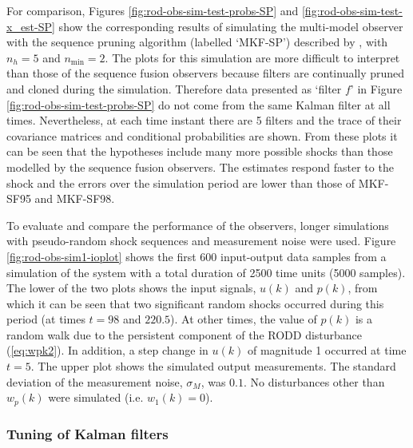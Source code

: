 For comparison, Figures \ref{fig:rod-obs-sim-test-probs-SP} and \ref{fig:rod-obs-sim-test-x_est-SP} show the corresponding results of simulating the multi-model observer with the sequence pruning algorithm (labelled `MKF-SP') described by \cite{eriksson_classification_1996}, with $n_h=5$ and $n_{\text{min}}=2$. The plots for this simulation are more difficult to interpret than those of the sequence fusion observers because filters are continually pruned and cloned during the simulation. Therefore data presented as `filter $f$' in Figure \ref{fig:rod-obs-sim-test-probs-SP} do not come from the same Kalman filter at all times. Nevertheless, at each time instant there are 5 filters and the trace of their covariance matrices and conditional probabilities are shown. From these plots it can be seen that the hypotheses include many more possible shocks than those modelled by the sequence fusion observers. The estimates respond faster to the shock and the errors over the simulation period are lower than those of MKF-SF95 and MKF-SF98.

To evaluate and compare the performance of the observers, longer simulations with pseudo-random shock sequences and measurement noise were used. Figure \ref{fig:rod-obs-sim1-ioplot} shows the first 600 input-output data samples from a simulation of the system with a total duration of 2500 time units (5000 samples). The lower of the two plots shows the input signals, $u(k)$ and $p(k)$, from which it can be seen that two significant random shocks occurred during this period (at times $t=98$ and $220.5$). At other times, the value of $p(k)$ is a random walk due to the persistent component of the RODD disturbance (\ref{eq:wpk2}). In addition, a step change in $u(k)$ of magnitude 1 occurred at time $t=5$. The upper plot shows the simulated output measurements. The standard deviation of the measurement noise, $\sigma_M$, was $0.1$. No disturbances other than $w_p(k)$ were simulated (i.e. $w_1(k)=0$).

\subsubsection{Tuning of Kalman filters} \label{sim-obs-lin-1-KF-tuning}


